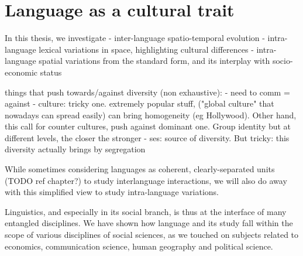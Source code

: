 \documentclass[../thesis.tex]{subfiles}
\begin{document}





\section{Language as a cultural trait}



In this thesis, we investigate
- inter-language spatio-temporal evolution
- intra-language lexical variations in space, highlighting cultural differences
- intra-language spatial variations from the standard form, and its interplay with socio-economic status



things that push towards/against diversity (non exhaustive):
- need to comm = against
- culture: tricky one. extremely popular stuff, ("global culture" that nowadays can spread easily) can bring homogeneity (eg Hollywood). Other hand, this call for counter cultures, push against dominant one. Group identity but at different levels, the closer the stronger
- ses: source of diversity. But tricky: this diversity actually brings by segregation


While sometimes
considering languages as coherent, clearly-separated units (TODO ref chapter?) to study interlanguage interactions, we will also do away with this simplified view to study intra-language variations.

Linguistics, and especially in its social branch, is thus at the interface of many entangled disciplines. We have shown how language and its study fall within the scope of various disciplines of social sciences, as we touched on subjects related to economics, communication science, human geography and political science.   

\cite{LabovPrinciplesLinguistic1994,LabovPrinciplesLinguistic2001,LabovPrinciplesLinguistic2010}
\end{document}
